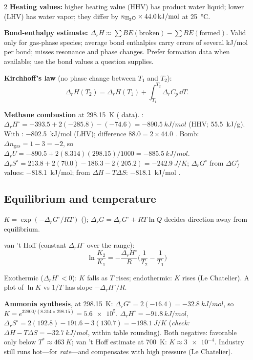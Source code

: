 \begin{multicols}{2}
\textbf{Heating values:} higher heating value (HHV) has product water liquid; lower (LHV) has water vapor; they differ by $n_{\ce{H2O}}\times\SI{44.0}{kJ/mol}$ at \SI{25}{\celsius}.

\textbf{Bond-enthalpy estimate:} $\Delta_rH\approx\sum BE(\text{broken})-\sum BE(\text{formed})$. Valid only for gas-phase species; average bond enthalpies carry errors of several kJ/mol per bond; misses resonance and phase changes. Prefer formation data when available; use the bond values a question supplies.

\textbf{Kirchhoff's law} (no phase change between $T_1$ and $T_2$):
\begin{equation}
\Delta_rH(T_2)=\Delta_rH(T_1)+\int_{T_1}^{T_2}\Delta_rC_p\,\dd T. \label{F:thermo:kirchhoff}
\end{equation}

\begin{demobox}\textbf{Methane combustion} at \SI{298.15}{K} ( data). : $\Delta_rH^\circ=-393.5+2(-285.8)-(-74.6)=\SI{-890.5}{kJ/mol}$ (HHV; \SI{55.5}{kJ/g}). With : \SI{-802.5}{kJ/mol} (LHV); difference $88.0=2\times44.0$ \checkmark.
Bomb: $\Delta n_{\text{gas}}=1-3=-2$, so $\Delta_rU=-890.5+2(8.314)(298.15)/1000=\SI{-885.5}{kJ/mol}$.
$\Delta_rS^\circ=213.8+2(70.0)-186.3-2(205.2)=\SI{-242.9}{J/K}$; $\Delta_rG^\circ$ from $\Delta G_f^\circ$ values: \SI{-818.1}{kJ/mol}; from $\Delta H-T\Delta S$: \SI{-818.1}{kJ/mol} \checkmark.\end{demobox}

\subsection{Equilibrium and temperature}\label{sec:thermoK}
\CORE{} $K=\exp(-\Delta_rG^\circ/RT)$ (); $\Delta_rG=\Delta_rG^\circ+RT\ln Q$ decides direction away from equilibrium.
\begin{formulabox}van 't Hoff (constant $\Delta_rH^\circ$ over the range):
\begin{equation}
\ln\frac{K_2}{K_1}=-\frac{\Delta_rH^\circ}{R}\Big(\frac{1}{T_2}-\frac{1}{T_1}\Big) \label{F:thermo:vanthoff}
\end{equation}
\end{formulabox}
Exothermic ($\Delta_rH^\circ<0$): $K$ falls as $T$ rises; endothermic: $K$ rises (Le Chatelier). A plot of $\ln K$ vs $1/T$ has slope $-\Delta_rH^\circ/R$.

\begin{demobox}\textbf{Ammonia synthesis},  at \SI{298.15}{K}: $\Delta_rG^\circ=2(-16.4)=\SI{-32.8}{kJ/mol}$, so $K=e^{32800/(8.314\times298.15)}=\num{5.6e5}$. $\Delta_rH^\circ=\SI{-91.8}{kJ/mol}$, $\Delta_rS^\circ=2(192.8)-191.6-3(130.7)=\SI{-198.1}{J/K}$ (\emph{check:} $\Delta H-T\Delta S=\SI{-32.7}{kJ/mol}$, within table rounding). Both negative: favorable only below $T^\ast\approx\SI{463}{K}$; van 't Hoff estimate at \SI{700}{K}: $K\approx\num{3e-4}$. Industry still runs hot---for \emph{rate}---and compensates with high pressure (Le Chatelier).\end{demobox}


\end{multicols}
